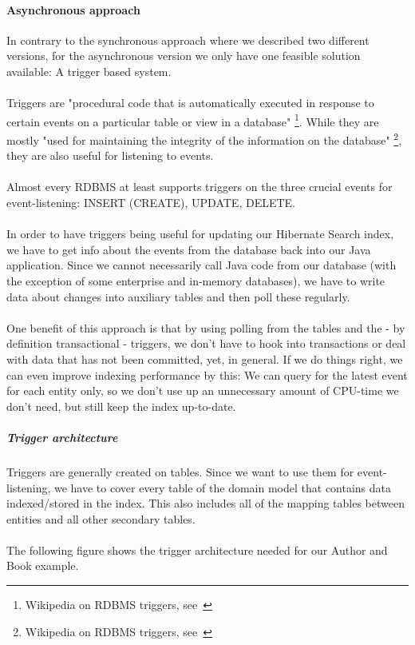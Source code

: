 \paragraph{Asynchronous approach}
In contrary to the synchronous approach where we described two different versions, for the asynchronous version we only have one feasible solution available: A trigger based system.
\\\\
Triggers are "procedural code that is automatically executed in response to certain events on a particular table or view in a database" \footnote{Wikipedia on RDBMS triggers, see~\cite{triggers_wiki}}. While they are mostly "used for maintaining the integrity of the information on the database" \footnote{Wikipedia on RDBMS triggers, see~\cite{triggers_wiki}}, they are also useful for listening to events.
\\\\
Almost every RDBMS at least supports triggers on the three crucial events for event-listening: INSERT (CREATE), UPDATE, DELETE.
\\\\
In order to have triggers being useful for updating our Hibernate Search index, we have to get info about the events from the database back into our Java application. Since we cannot necessarily call Java code from our database (with the exception of some enterprise and in-memory databases), we have to write data about changes into auxiliary tables and then poll these regularly.
\\\\
One benefit of this approach is that by using polling from the tables and the - by definition transactional - triggers, we don't have to hook into transactions or deal with data that has not been committed, yet, in general. If we do things right, we can even improve indexing performance by this: We can query for the latest event for each entity only, so we don't use up an unnecessary amount of CPU-time we don't need, but still keep the index up-to-date.

\pagebreak

\subparagraph{Trigger architecture}

Triggers are generally created on tables. Since we want to use them for event-listening, we have to cover every table of the domain model that contains data indexed/stored in the index. This also includes all of the mapping tables between entities and all other secondary tables.
\\\\
The following figure shows the trigger architecture needed for our Author and Book example.

